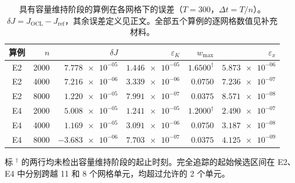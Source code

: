 \begin{table}[htbp]
\centering\small
\setlength{\tabcolsep}{5pt}
\caption{具有容量维持阶段的算例在各网格下的误差（$T=300$，$\Delta t=T/n$）。$\delta J=J_{\mathrm{OCL}}-J_{\mathrm{ref}}$，其余误差定义见正文。全部五个算例的逐网格数值见补充材料。}
\label{tab:grid-errors-capacity}
\begin{tabular}{@{}crrrrr@{}}
\toprule
算例 & $n$ & $\delta J$ & $\varepsilon_K$ & $w_{\max}$ & $\varepsilon_x$\\
\midrule
E2 & 2000 & $\num{+7.778e-05}$ & $\num{1.446e-05}$ & $1.6500^{\dagger}$ & $\num{5.873e-06}$\\
E2 & 4000 & $\num{+7.216e-06}$ & $\num{3.339e-06}$ & $0.0750$ & $\num{7.236e-07}$\\
E2 & 8000 & $\num{+1.220e-05}$ & $\num{7.991e-07}$ & $0.0375$ & $\num{8.571e-08}$\\
\addlinespace[2pt]
E4 & 2000 & $\num{+5.008e-05}$ & $\num{1.241e-05}$ & $1.2000^{\dagger}$ & $\num{2.490e-07}$\\
E4 & 4000 & $\num{+1.169e-05}$ & $\num{3.091e-06}$ & $0.0750$ & $\num{3.187e-08}$\\
E4 & 8000 & $\num{-3.683e-06}$ & $\num{7.703e-07}$ & $0.0375$ & $\num{4.125e-09}$\\
\bottomrule
\end{tabular}
\par\smallskip
\begin{minipage}{0.98\linewidth}\footnotesize
标 $^{\dagger}$ 的两行均未检出容量维持阶段的起止时刻。完全追踪的起始候选区间在 E2、E4 中分别跨越 11 和 8 个网格单元，均超过允许的 2 个单元。
\end{minipage}
\end{table}
